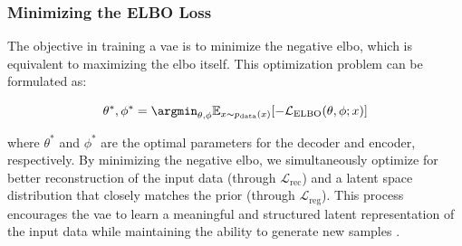 \subsubsection{Minimizing the ELBO Loss}
The objective in training a \acrshort{vae} is to minimize the negative \acrshort{elbo}, which is equivalent to maximizing the \acrshort{elbo} itself. This optimization problem can be formulated as:

\begin{equation}
    \theta^*, \phi^* = \argmin_{\theta, \phi} \mathbb{E}_{x \sim p_{\text{data}}(x)}[-\mathcal{L}_{\text{ELBO}}(\theta, \phi; x)]
\end{equation}

where $\theta^*$ and $\phi^*$ are the optimal parameters for the decoder and encoder, respectively. By minimizing the negative \acrshort{elbo}, we simultaneously optimize for better reconstruction of the input data (through $\mathcal{L}_{\text{rec}}$) and a latent space distribution that closely matches the prior (through $\mathcal{L}_{\text{reg}}$). This process encourages the \acrshort{vae} to learn a meaningful and structured latent representation of the input data while maintaining the ability to generate new samples \cite{kingma2022autoencodingvariationalbayes}.